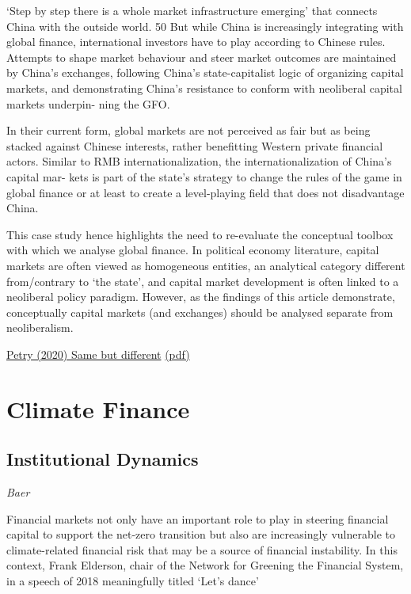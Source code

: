 \documentclass[
]{book}
\begin{document}
`Step by step there is a whole market infrastructure
emerging' that connects China with the outside world. 50 But while China is increasingly
integrating with global finance, international investors have to play according to Chinese
rules. Attempts to shape market behaviour and steer market outcomes are maintained by
China's exchanges, following China's state-capitalist logic of organizing capital markets,
and demonstrating China's resistance to conform with neoliberal capital markets underpin-
ning the GFO.

In their current form, global markets are not perceived as fair but as being stacked against
Chinese interests, rather benefitting Western private financial actors.
Similar to RMB internationalization, the internationalization of China's capital mar-
kets is part of the state's strategy to change the rules of the game in global finance or at least
to create a level-playing field that does not disadvantage China.

This case study hence highlights the need to re-evaluate the conceptual toolbox with
which we analyse global finance. In political economy literature, capital markets are often
viewed as homogeneous entities, an analytical category different from/contrary to `the
state', and capital market development is often linked to a neoliberal policy paradigm.
However, as the findings of this article demonstrate, conceptually capital markets (and
exchanges) should be analysed separate from neoliberalism.

\href{https://journals.sagepub.com/doi/10.1177/1024529420964723}{Petry (2020) Same but different}
\href{pdf/Petry_2020_Same_but_different_China_Capital_Markets.pdf}{(pdf)}

\hypertarget{climate-finance}{%
\chapter{Climate Finance}\label{climate-finance}}

\hypertarget{institutional-dynamics}{%
\section{Institutional Dynamics}\label{institutional-dynamics}}

\emph{Baer}

Financial markets not only have an important role to play in steering financial capital to support the net-zero transition but also are increasingly vulnerable to climate-related financial risk that may be a source of financial instability. In this context, Frank Elderson, chair of the Network for Greening the Financial System, in a speech of 2018 meaningfully titled `Let's dance'﻿
\end{document}
